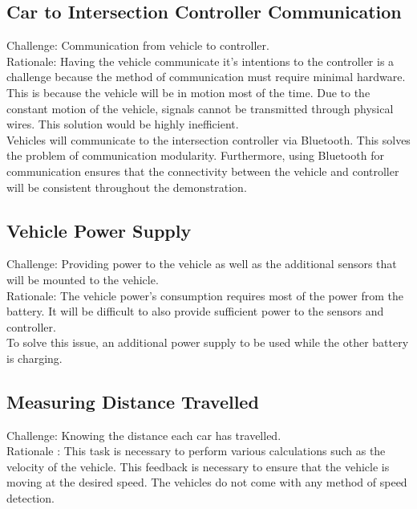 \documentclass [11pt]{article}
\begin{document}

\subsection{Car to Intersection Controller Communication}

Challenge: Communication from vehicle to controller. \\

Rationale: Having the vehicle communicate it's intentions to the controller is a challenge because the method of communication must require minimal hardware.  This is because the vehicle will be in motion most of the time.  Due to the constant motion of the vehicle, signals cannot be transmitted through physical wires. This solution would be highly inefficient. \\

 Vehicles will communicate to the intersection controller via Bluetooth. This solves the problem of communication modularity. Furthermore, using Bluetooth for communication ensures that the connectivity between the vehicle and controller will be consistent throughout the demonstration. 

\subsection{Vehicle Power Supply}
Challenge: Providing power to the vehicle as well as the additional sensors that will be mounted to the vehicle. \\

Rationale: The vehicle power's consumption requires most of the power from the battery. It will be difficult to also provide sufficient power to the sensors and controller. \\

To solve this issue, an additional power supply to be used while the other battery is charging. 

\subsection{Measuring Distance Travelled}

Challenge: Knowing the distance each car has travelled. \\

Rationale : This task is necessary to perform various calculations such as the velocity of the vehicle. This feedback is necessary to ensure that the vehicle is moving at the desired speed. The vehicles do not come with any method of speed detection.  \\
\end{document}
